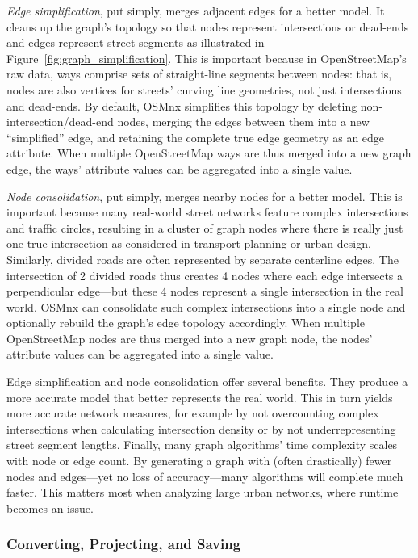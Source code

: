 \documentclass[12pt,letterpaper]{article} %
\begin{document}
\textit{Edge simplification}, put simply, merges adjacent edges for a better model. It cleans up the graph's topology so that nodes represent intersections or dead-ends and edges represent street segments as illustrated in Figure~\ref{fig:graph_simplification}. This is important because in OpenStreetMap's raw data, ways comprise sets of straight-line segments between nodes: that is, nodes are also vertices for streets' curving line geometries, not just intersections and dead-ends. By default, OSMnx simplifies this topology by deleting non-intersection/dead-end nodes, merging the edges between them into a new \enquote{simplified} edge, and retaining the complete true edge geometry as an edge attribute. When multiple OpenStreetMap ways are thus merged into a new graph edge, the ways' attribute values can be aggregated into a single value.

\textit{Node consolidation}, put simply, merges nearby nodes for a better model. This is important because many real-world street networks feature complex intersections and traffic circles, resulting in a cluster of graph nodes where there is really just one true intersection as considered in transport planning or urban design. Similarly, divided roads are often represented by separate centerline edges. The intersection of 2 divided roads thus creates 4 nodes where each edge intersects a perpendicular edge---but these 4 nodes represent a single intersection in the real world. OSMnx can consolidate such complex intersections into a single node and optionally rebuild the graph's edge topology accordingly. When multiple OpenStreetMap nodes are thus merged into a new graph node, the nodes' attribute values can be aggregated into a single value.

Edge simplification and node consolidation offer several benefits. They produce a more accurate model that better represents the real world. This in turn yields more accurate network measures, for example by not overcounting complex intersections when calculating intersection density or by not underrepresenting street segment lengths. Finally, many graph algorithms' time complexity scales with node or edge count. By generating a graph with (often drastically) fewer nodes and edges---yet no loss of accuracy---many algorithms will complete much faster. This matters most when analyzing large urban networks, where runtime becomes an issue.

\subsubsection{Converting, Projecting, and Saving}
\end{document}
